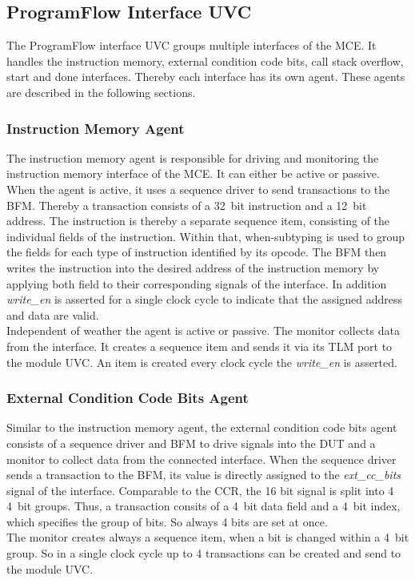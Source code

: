 \subsection{ProgramFlow Interface UVC}

The ProgramFlow interface UVC groups multiple interfaces of the MCE. 
It handles the instruction memory, external condition code bits, call stack overflow, start and done interfaces.
Thereby each interface has its own agent.
These agents are described in the following sections.

\subsubsection{Instruction Memory Agent}

The instruction memory agent is responsible for driving and monitoring the instruction memory interface of the MCE.
It can either be active or passive.
When the agent is active, it uses a sequence driver to send transactions to the BFM.
Thereby a transaction consists of a 32~bit instruction and a 12~bit address.
The instruction is thereby a separate sequence item, consisting of the individual fields of the instruction.
Within that, when-subtyping is used to group the fields for each type of instruction identified by its opcode.
The BFM then writes the instruction into the desired address of the instruction memory by applying both field to their corresponding signals of the interface.
In addition \emph{write\_en} is asserted for a single clock cycle to indicate that the assigned address and data are valid.\\
Independent of weather the agent is active or passive. The monitor collects data from the interface. It creates a sequence item and sends it via its TLM port to
the module UVC. An item is created every clock cycle the \emph{write\_en} is asserted.


\subsubsection{External Condition Code Bits Agent}

Similar to the instruction memory agent, the external condition code bits agent consists of a sequence driver and BFM to drive signals into the DUT and a
monitor to collect data from the connected interface.
When the sequence driver sends a transaction to the BFM, its value is directly assigned to the \emph{ext\_cc\_bits} signal of the interface.
Comparable to the CCR, the 16 bit signal is split into 4 4~bit groups. Thus, a transaction consits of a 4~bit data field and a 4~bit index, which specifies the
group of bits. So always 4 bits are set at once.\\
The monitor creates always a sequence item, when a bit is changed within a 4~bit group. 
So in a single clock cycle up to 4 transactions can be created and send to the module UVC.


